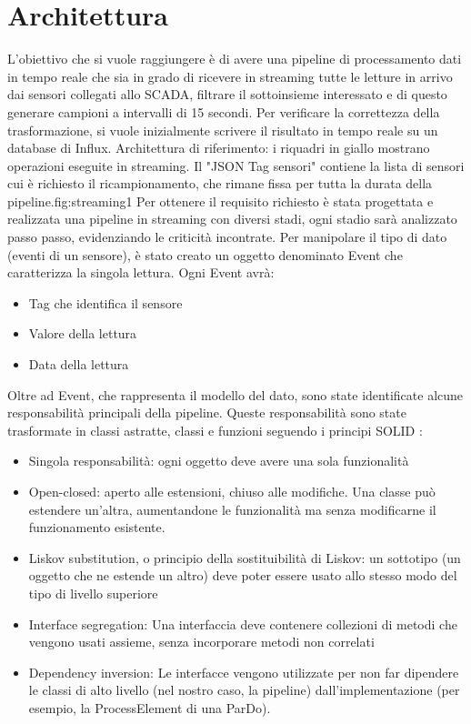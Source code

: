 \section{Architettura}
L'obiettivo che si vuole raggiungere è di avere una pipeline di processamento dati in tempo reale che sia in grado di ricevere in streaming tutte le letture in arrivo dai sensori collegati allo SCADA, filtrare il sottoinsieme interessato e di questo generare campioni a intervalli di 15 secondi. Per verificare la correttezza della trasformazione, si vuole inizialmente scrivere il risultato in tempo reale su un database di Influx.
{Architettura di riferimento: i riquadri in giallo mostrano operazioni eseguite in streaming. Il "JSON Tag sensori" contiene la lista di sensori cui è richiesto il ricampionamento, che rimane fissa per tutta la durata della pipeline.}{fig:streaming1}
Per ottenere il requisito richiesto è stata progettata e realizzata una pipeline in streaming con diversi stadi, ogni stadio sarà analizzato passo passo, evidenziando le criticità incontrate. Per manipolare il tipo di dato (eventi di un sensore), è stato creato un oggetto denominato Event che caratterizza la singola lettura. Ogni Event avrà:
\begin{itemize}
\item Tag che identifica il sensore
\item Valore della lettura
\item Data della lettura
\end{itemize}
Oltre ad Event, che rappresenta il modello del dato, sono state identificate alcune responsabilità principali della pipeline. Queste responsabilità sono state trasformate in classi astratte, classi e funzioni seguendo i principi SOLID \cite{martin2000design}: 
\begin{itemize}
\item Singola responsabilità: ogni oggetto deve avere una sola funzionalità
\item Open-closed: aperto alle estensioni, chiuso alle modifiche. Una classe può estendere un'altra, aumentandone le funzionalità ma senza modificarne il funzionamento esistente.
\item Liskov substitution, o principio della sostituibilità di Liskov: un sottotipo (un oggetto che ne estende un altro) deve poter essere usato allo stesso modo del tipo di livello superiore
\item Interface segregation: Una interfaccia deve contenere collezioni di metodi che vengono usati assieme, senza incorporare metodi non correlati
\item Dependency inversion: Le interfacce vengono utilizzate per non far dipendere le classi di alto livello (nel nostro caso, la pipeline) dall'implementazione (per esempio, la ProcessElement di una ParDo).
\end{itemize}

